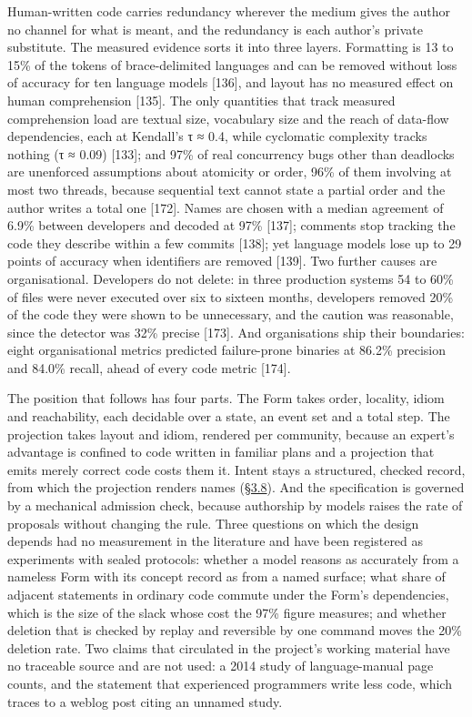 \documentclass[10pt,letterpaper]{article}
\begin{document}
Human-written code carries redundancy wherever the medium gives the
author no channel for what is meant, and the redundancy is each author's
private substitute. The measured evidence sorts it into three layers.
Formatting is 13 to 15\% of the tokens of brace-delimited languages and
can be removed without loss of accuracy for ten language models
{[}136{]}, and layout has no measured effect on human comprehension
{[}135{]}. The only quantities that track measured comprehension load
are textual size, vocabulary size and the reach of data-flow
dependencies, each at Kendall's τ ≈ 0.4, while cyclomatic complexity
tracks nothing (τ ≈ 0.09) {[}133{]}; and 97\% of real concurrency bugs
other than deadlocks are unenforced assumptions about atomicity or
order, 96\% of them involving at most two threads, because sequential
text cannot state a partial order and the author writes a total one
{[}172{]}. Names are chosen with a median agreement of 6.9\% between
developers and decoded at 97\% {[}137{]}; comments stop tracking the
code they describe within a few commits {[}138{]}; yet language models
lose up to 29 points of accuracy when identifiers are removed {[}139{]}.
Two further causes are organisational. Developers do not delete: in
three production systems 54 to 60\% of files were never executed over
six to sixteen months, developers removed 20\% of the code they were
shown to be unnecessary, and the caution was reasonable, since the
detector was 32\% precise {[}173{]}. And organisations ship their
boundaries: eight organisational metrics predicted failure-prone
binaries at 86.2\% precision and 84.0\% recall, ahead of every code
metric {[}174{]}.

The position that follows has four parts. The Form takes order,
locality, idiom and reachability, each decidable over a state, an event
set and a total step. The projection takes layout and idiom, rendered
per community, because an expert's advantage is confined to code written
in familiar plans and a projection that emits merely correct code costs
them it. Intent stays a structured, checked record, from which the
projection renders names
(\href{https://research.openie.dev/papers/rce/\#38-behaviour-equivalence-and-dimension}{§3.8}).
And the specification is governed by a mechanical admission check,
because authorship by models raises the rate of proposals without
changing the rule. Three questions on which the design depends had no
measurement in the literature and have been registered as experiments
with sealed protocols: whether a model reasons as accurately from a
nameless Form with its concept record as from a named surface; what
share of adjacent statements in ordinary code commute under the Form's
dependencies, which is the size of the slack whose cost the 97\% figure
measures; and whether deletion that is checked by replay and reversible
by one command moves the 20\% deletion rate. Two claims that circulated
in the project's working material have no traceable source and are not
used: a 2014 study of language-manual page counts, and the statement
that experienced programmers write less code, which traces to a weblog
post citing an unnamed study.
\end{document}

